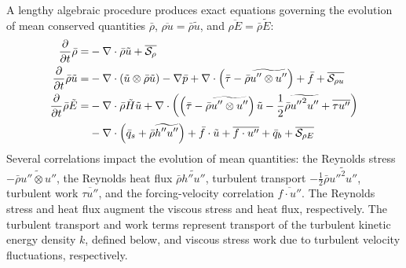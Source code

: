 A lengthy algebraic procedure \citep[\textsection{}2]{OliverFANSModels2011}
produces exact equations governing the evolution of mean conserved quantities
$\bar{\rho}$, $\overline{\rho{}u}= \bar{\rho}\tilde{u}$, and
$\overline{\rho{}E} = \bar{\rho}\tilde{E}$:
\begin{subequations}\label{eq:unclosedfansequations}
\begin{align}
    \frac{\partial}{\partial{}t}\bar{\rho}
 =
 &- \nabla\cdot\bar{\rho}\tilde{u}
  + \overline{\mathcal{S}_{\rho{}}}
\\
    \frac{\partial{}}{\partial{}t}\bar{\rho}\tilde{u}
 =
 &- \nabla\cdot(\tilde{u}\otimes\bar{\rho}\tilde{u})
  - \nabla{}\bar{p}
  + \nabla\cdot\left(
        \bar{\tau}
      - \bar{\rho}\widetilde{u''\otimes{}u''}
    \right)
  + \bar{f}
  + \overline{\mathcal{S}_{\rho{} u}}
\\
  \frac{\partial}{\partial{}t} \bar{\rho}\tilde{E}
 =
 &- \nabla\cdot{}\bar{\rho}\tilde{H}\tilde{u}
  + \nabla\cdot\left(
        \left(
            \bar{\tau}
          - \bar{\rho} \widetilde{u''\otimes{}u''}
        \right) \tilde{u}
      - \frac{1}{2}\bar{\rho}\widetilde{{u''}^{2}u''}
      + \overline{\tau{}u''}
    \right)
\\
 &- \nabla\cdot\left(
        \bar{q}_s
      + \bar{\rho} \widetilde{h''u''}
    \right)
  + \bar{f}\cdot\tilde{u}
  + \overline{f\cdot{}u''}
  + \bar{q}_{b}
  + \overline{\mathcal{S}_{\rho{} E}}
\end{align}
\end{subequations}
Several correlations impact the evolution of mean quantities: the Reynolds
stress $-\bar{\rho}\widetilde{u''\otimes{}u''}$, the Reynolds heat flux
$\bar{\rho} \widetilde{h''u''}$, turbulent transport
$-\frac{1}{2}\bar{\rho}\widetilde{{u''}^{2}u''}$, turbulent work
$\overline{\tau{}u''}$, and the forcing-velocity correlation
$\overline{f\cdot{}u''}$.  The Reynolds stress and heat flux augment the
viscous stress and heat flux, respectively.  The turbulent transport and work
terms represent transport of the turbulent kinetic energy density $k$, defined
below, and viscous stress work due to turbulent velocity fluctuations,
respectively.

